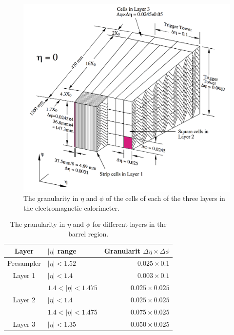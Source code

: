 \begin{figure}
\centering
\includegraphics[width=\textwidth]{data/photo/detector/ECAL.png}
\caption{The granularity in $\eta$ and $\phi$ of the cells of each of the three layers in the electromagnetic calorimeter. \cite{ATLAS_doc}}
\label{fig:ECAL}
\end{figure}

\begin{table}[htpb]
\centering
\begin{tabular}{|c|l|r|}
\hline
Layer & $|\eta|$ range & Granularit $\Delta \eta \times \Delta \phi$ \\
\hline
\hline
Presampler & $|\eta| < 1.52$         & $0.025 \times 0.1$ \\
\hline
Layer 1    & $|\eta| < 1.4$          & $0.003 \times 0.1$ \\
           & $1.4 < |\eta| < 1.475$  & $0.025 \times 0.025$ \\
\hline
Layer 2    & $|\eta| < 1.4$          & $0.025 \times 0.025$ \\
           & $1.4 < |\eta| < 1.475$  & $0.075 \times 0.025$ \\
\hline
Layer 3    & $|\eta| < 1.35$         & $0.050 \times 0.025$ \\
\hline
\end{tabular}
\caption{The granularity in $\eta$ and $\phi$ for different layers in the barrel region. \cite{ATLAS_doc}}
\label{tab:granularity_EM_barrel}
\end{table}

